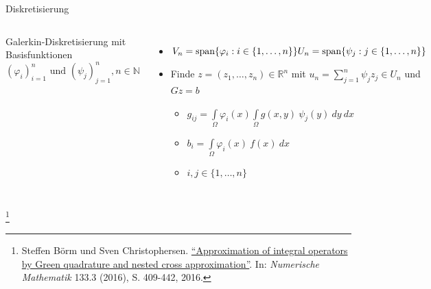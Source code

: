 \documentclass[10pt]{beamer}
\let\svthefootnote\thefootnote
\begin{document}
\begin{frame}{Diskretisierung}
  \begin{columns}
      Galerkin-Diskretisierung mit Basisfunktionen\\
      \({(\varphi_{i})}_{i = 1}^{n} \text{ und }
        {(\psi_{j})}_{j = 1}^{n}, n \in \mathbb{N}\)
      \begin{itemize}
        \item \( V_{n} = \text{span}\{ \varphi_{i} : i \in \{ 1, \hdots, n\} \}
                \newline
                U_{n} = \text{span}\{ \psi_{j} : j \in \{ 1, \hdots, n\} \} \)
        \item Finde \(z = (z_{1}, \hdots, z_{n}) \in \mathbb{R}^{n} \) mit
              \( u_{n}  = \sum\limits_{j = 1}^{n} \psi_{j} z_{j} \in U_{n} \) 
              und \( Gz = b \)
        \begin{itemize}
          \item \( g_{ij} = \int\limits_{\Omega} \varphi_{i}(x)
                   \int\limits_{\Omega} g(x, y) \ \psi_{j}(y) \ dy \ dx \)
          \item \(b_{i} = \int\limits_{\Omega} \varphi_{i}(x) \ f(x) \ dx\)
          \item \( i, j \in \{ 1, \hdots, n \} \)
        \end{itemize}
      \end{itemize}
      \centering
      \includegraphics[width=1.5\linewidth]{figures/fg-sphere-tri.pdf}
  \end{columns}
  \footnotesize
  \let\thefootnote\relax\footnote{Steffen Börm und Sven Christophersen.
  \href{https://link.springer.com/article/10.1007\%2Fs00211-015-0757-y}{
  ``Approximation of integral operators by Green quadrature and nested cross 
  approximation''}. In:   \textit{Numerische Mathematik} 133.3 (2016), S. 
  409-442, 2016.}
  \addtocounter{footnote}{-1}\let\thefootnote\svthefootnote\relax
  \normalsize
\end{frame}
\end{document}
